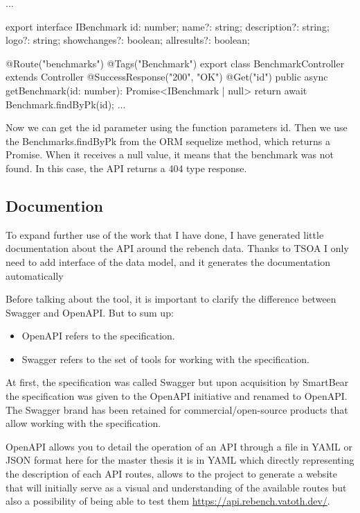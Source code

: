 \documentclass{article}
\begin{document}
\begin{python}
...

export interface IBenchmark {
  id: number;
  name?: string;
  description?: string;
  logo?: string;
  showchanges?: boolean;
  allresults?: boolean;
}

@Route("benchmarks")
@Tags("Benchmark")
export class BenchmarkController extends Controller {
  @SuccessResponse("200", "OK")
  @Get("{id}")
  public async getBenchmark(id: number): Promise<IBenchmark | null> {
    return await Benchmark.findByPk(id);
  }
  ...
}
\end{python}

Now we can get the id parameter using the function parameters id. Then we use the Benchmarks.findByPk from the ORM sequelize method, which returns a Promise. When it receives a null value, it means that the benchmark was not found. In this case, the API returns a 404 type response.

\subsection{Documention}

To expand further use of the work that I have done, I have generated little documentation about the API around the rebench data.
Thanks to TSOA I only need to add interface of the data model, and it generates the documentation automatically

Before talking about the tool, it is important to clarify the difference between Swagger and OpenAPI. But to sum up:

\begin{itemize}
    \item OpenAPI refers to the specification.
    \item Swagger refers to the set of tools for working with the specification.
\end{itemize}

At first, the specification was called Swagger but upon acquisition by SmartBear the specification was given to the OpenAPI initiative and renamed to OpenAPI. The Swagger brand has been retained for commercial/open-source products that allow working with the specification.

OpenAPI allows you to detail the operation of an API through a file in YAML or JSON format here for the master thesis it is in YAML which directly representing the description of each API routes, allows to the project to generate a website that will initially serve as a visual and understanding of the available routes but also a possibility of being able to test them \url{https://api.rebench.vatoth.dev/}.
\end{document}
